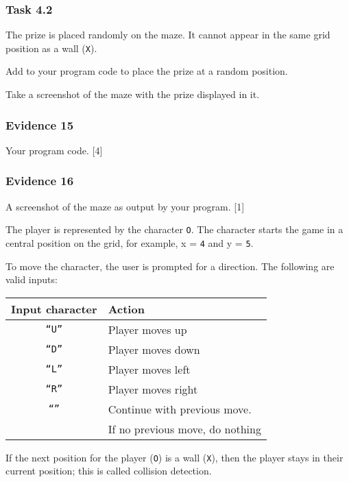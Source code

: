 \subsubsection*{Task 4.2}

The prize is placed randomly on the maze. It cannot appear in the
same grid position as a wall (\textquotedbl\texttt{X}\textquotedbl ).

Add to your program code to place the prize at a random position.

Take a screenshot of the maze with the prize displayed in it.

\subsubsection*{Evidence 15}

Your program code. \hfill{}{[}4{]}

\subsubsection*{Evidence 16}

A screenshot of the maze as output by your program. \hfill{} {[}1{]}

The player is represented by the character \textquotedbl\texttt{O}\textquotedbl .
The character starts the game in a central position on the grid, for
example, x = \texttt{4} and y = \texttt{5}. 

To move the character, the user is prompted for a direction. The following
are valid inputs:
\begin{center}
\begin{tabular}{|c|l|}
\hline 
\textbf{Input character} & \hspace{0.05\columnwidth}\textbf{Action}\tabularnewline
\hline 
\texttt{``U''} & Player moves up\tabularnewline
\hline 
\texttt{``D''} & Player moves down\tabularnewline
\hline 
\texttt{``L''} & Player moves left\tabularnewline
\hline 
\texttt{``R''} & Player moves right\tabularnewline
\hline 
\texttt{``''} & Continue with previous move.\tabularnewline
 & If no previous move, do nothing\tabularnewline
\hline 
\end{tabular}
\par\end{center}

If the next position for the player (\textquotedbl\texttt{O}\textquotedbl )
is a wall (\textquotedbl\texttt{X}\textquotedbl ), then the player
stays in their current position; this is called collision detection.

